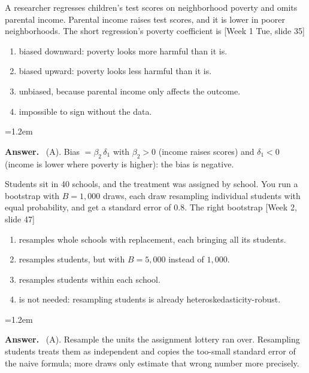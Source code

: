 \documentclass[11pt]{article}
\newenvironment{answer}{\par\smallskip
  \begin{list}{}{\leftmargin=1.2em\rightmargin=0pt}\item[]\color{dukeblue}%
  \textbf{Answer.}\ }{\end{list}\smallskip}
\newcommand{\slideref}[2]{{\footnotesize\color{gray}[Week #1, slide #2]}}
\begin{document}
\begin{enumerate}[leftmargin=*,itemsep=8pt]
\item A researcher regresses children's test scores on neighborhood poverty and omits
      parental income. Parental income raises test scores, and it is lower in poorer
      neighborhoods. The short regression's poverty coefficient is \slideref{1 Tue}{35}
      \begin{enumerate}[label=(\Alph*),itemsep=0pt]
      \item biased downward: poverty looks more harmful than it is.
      \item biased upward: poverty looks less harmful than it is.
      \item unbiased, because parental income only affects the outcome.
      \item impossible to sign without the data.
      \end{enumerate}
\begin{answer}
(A). Bias $= \beta_2\,\delta_1$ with $\beta_2 > 0$ (income raises scores) and $\delta_1 < 0$
(income is lower where poverty is higher): the bias is negative.
\end{answer}

\item Students sit in 40 schools, and the treatment was assigned by school. You run a
      bootstrap with $B = 1{,}000$ draws, each draw resampling individual students with
      equal probability, and get a standard error of 0.8. The right bootstrap
      \slideref{2}{47}
      \begin{enumerate}[label=(\Alph*),itemsep=0pt]
      \item resamples whole schools with replacement, each bringing all its students.
      \item resamples students, but with $B = 5{,}000$ instead of $1{,}000$.
      \item resamples students within each school.
      \item is not needed: resampling students is already heteroskedasticity-robust.
      \end{enumerate}
\begin{answer}
(A). Resample the units the assignment lottery ran over. Resampling students treats them
as independent and copies the too-small standard error of the naive formula; more draws
only estimate that wrong number more precisely.
\end{answer}


\end{enumerate}
\end{document}
